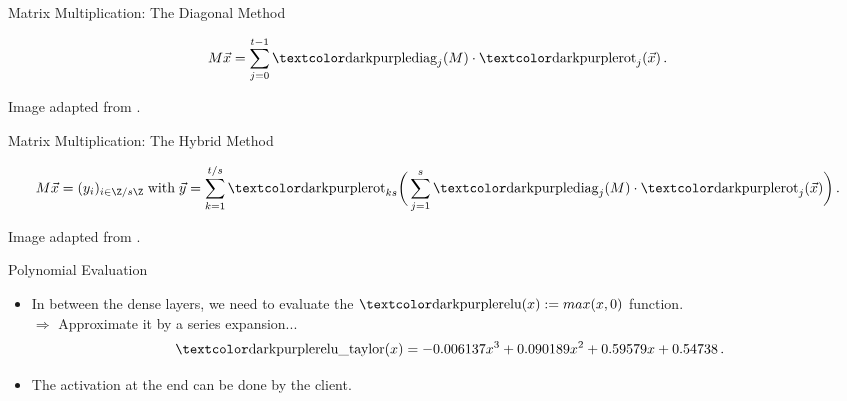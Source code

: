 \begin{frame}{Matrix Multiplication: The Diagonal Method}
  \begin{figure}[H]
    \centering
    \hspace{\matmulhoffset}
    \label{fig:diagonal-method}
  \end{figure}

  $$M \vec{x} = \sum_{j=0}^{t-1} \diag_j(M) \cdot \rot_j(\vec{x}) \,.$$

  \begin{flushright}\tiny Image adapted from \cite{2020-cryptotree}.\end{flushright}
\end{frame}

\begin{frame}{Matrix Multiplication: The Hybrid Method}
  \begin{figure}[H]
    \centering
    \hspace{\matmulhoffset}
    \label{fig:hybrid-method}
  \end{figure}

  $$M \vec{x} = (y_i)_{i \in \Z/s\Z} \;\text{with}\; \vec{y} = \sum_{k=1}^{t / s} \rot_{ks}\bigg(\sum_{j=1}^s \diag_j(M) \cdot \rot_j(\vec{x})\bigg) \,.$$

  \begin{flushright}\tiny Image adapted from \cite{2020-cryptotree}.\end{flushright}
\end{frame}

\begin{frame}{Polynomial Evaluation}
  \begin{itemize}
    \item In between the dense layers, we need to evaluate the $\cryptop{relu}(x) := max(x, 0)$ function. \\
          $\Rightarrow$ Approximate it by a series expansion...
          $$\cryptop{relu\_taylor}(x) = -0.006137 x^3 + 0.090189 x^2 + 0.59579 x + 0.54738 \,.$$
    \item The  activation at the end can be done by the client.
  \end{itemize}

  \begin{figure}[H]
    \centering
    \label{fig:taylor-relu}
  \end{figure}
\end{frame}

